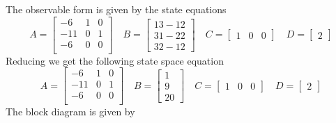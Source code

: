 \documentclass{article}
\begin{document}
\newline
The observable form is given by the state equations
$$
A =
\begin{bmatrix}
-6  & 1 & 0 \\
-11 & 0 & 1 \\
-6  & 0 & 0 \\
\end{bmatrix}
\quad
B =
\begin{bmatrix}
13 - 12 \\ 31 - 22 \\ 32 - 12
\end{bmatrix}
\quad
C =
\begin{bmatrix} 1 & 0 & 0 \end{bmatrix}
\quad
D =
\begin{bmatrix}
2
\end{bmatrix}
$$
Reducing we get the following state space equation
$$
A =
\begin{bmatrix}
-6  & 1 & 0 \\
-11 & 0 & 1 \\
-6  & 0 & 0 \\
\end{bmatrix}
\quad
B =
\begin{bmatrix} 1 \\ 9 \\ 20 \end{bmatrix}
\quad
C =
\begin{bmatrix}
1 & 0 & 0
\end{bmatrix}
\quad
D =
\begin{bmatrix}
2
\end{bmatrix}
$$
The block diagram is given by
\end{document}
